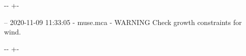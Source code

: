 \documentclass[letterpaper,10pt,english]{sphinxmanual}
\newlength\nbsphinxcodecellspacing
\begin{document}
{

\kern-\sphinxverbatimsmallskipamount\kern-\baselineskip
\kern+\FrameHeightAdjust\kern-\fboxrule
\vspace{\nbsphinxcodecellspacing}

\begin{sphinxVerbatim}[commandchars=\\\{\}]
-- 2020-11-09 11:33:05 - muse.mca - WARNING
Check growth constraints for wind.

\end{sphinxVerbatim}
}

{

\kern-\sphinxverbatimsmallskipamount\kern-\baselineskip
\kern+\FrameHeightAdjust\kern-\fboxrule
\vspace{\nbsphinxcodecellspacing}

}
\end{document}
